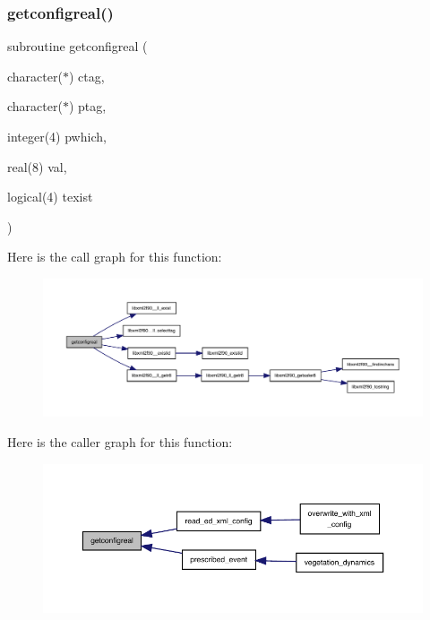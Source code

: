 \subsubsection{\texorpdfstring{getconfigreal()}{getconfigreal()}}
{\footnotesize\ttfamily subroutine getconfigreal (\begin{DoxyParamCaption}\item[{character($\ast$)}]{ctag,  }\item[{character($\ast$)}]{ptag,  }\item[{integer(4)}]{pwhich,  }\item[{real(8)}]{val,  }\item[{logical(4)}]{texist }\end{DoxyParamCaption})}

Here is the call graph for this function\+:
\nopagebreak
\begin{figure}[H]
\begin{center}
\leavevmode
\includegraphics[width=350pt]{ed__xml__config_8f90_a954b3037e7eb894975c79fed7627dfb0_cgraph}
\end{center}
\end{figure}
Here is the caller graph for this function\+:
\nopagebreak
\begin{figure}[H]
\begin{center}
\leavevmode
\includegraphics[width=350pt]{ed__xml__config_8f90_a954b3037e7eb894975c79fed7627dfb0_icgraph}
\end{center}
\end{figure}
\mbox{\label{ed__xml__config_8f90_af0adc799495cd223935aceec004ccb11}} 
